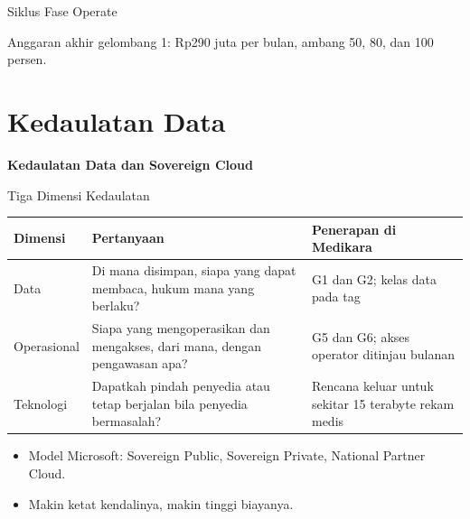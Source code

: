 \documentclass[aspectratio=169, table, 12pt]{beamer}
\begin{document}
\begin{frame}{{\Large Siklus Fase Operate}}
  \centering

  \vspace{4pt}
  {\small Anggaran akhir gelombang 1: Rp290 juta per bulan, ambang 50, 80, dan 100 persen.}
\end{frame}

\section{Kedaulatan Data}

\begin{frame}{\hfill}
  \centering
  \Huge{\textbf{Kedaulatan Data dan Sovereign Cloud}}
\end{frame}

\begin{frame}{{\Large Tiga Dimensi Kedaulatan}}
  \footnotesize
  \begin{tabularx}{\textwidth}{>{\raggedright\arraybackslash}p{2.0cm}
      >{\raggedright\arraybackslash}X >{\raggedright\arraybackslash}X}
    \hline
    \textbf{Dimensi} & \textbf{Pertanyaan} & \textbf{Penerapan di Medikara} \\ \hline
    Data & Di mana disimpan, siapa yang dapat membaca, hukum mana yang berlaku? & G1 dan G2; kelas
      data pada tag \\ \hline
    Operasional & Siapa yang mengoperasikan dan mengakses, dari mana, dengan pengawasan apa? & G5 dan
      G6; akses operator ditinjau bulanan \\ \hline
    Teknologi & Dapatkah pindah penyedia atau tetap berjalan bila penyedia bermasalah? & Rencana
      keluar untuk sekitar 15 terabyte rekam medis \\ \hline
  \end{tabularx}

  \vspace{8pt}
  \small
  \begin{itemize}
    \item Model Microsoft: Sovereign Public, Sovereign Private, National Partner Cloud.
    \item Makin ketat kendalinya, makin tinggi biayanya.
  \end{itemize}
\end{frame}
\end{document}
